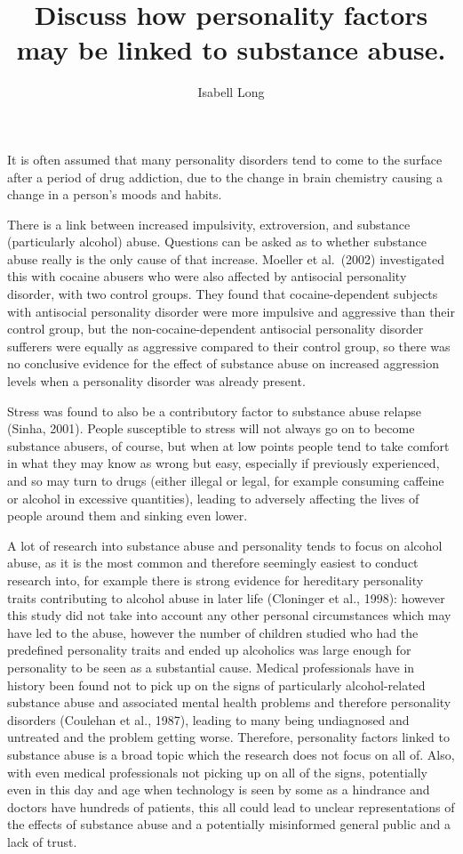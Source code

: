 \documentclass[a4paper]{article}
\begin{document}
\title{Discuss how personality factors may be linked to substance abuse.}	
\author{Isabell Long}
\maketitle

It is often assumed that many personality disorders tend to come to the surface after a period of drug addiction, due to the change in brain chemistry causing a change in a person's moods and habits.

There is a link between increased impulsivity, extroversion, and substance (particularly alcohol) abuse.  Questions can be asked as to whether substance abuse really is the only cause of that increase.  Moeller et al.\ (2002) investigated this with cocaine abusers who were also affected by antisocial personality disorder, with two control groups.  They found that cocaine-dependent subjects with antisocial personality disorder were more impulsive and aggressive than their control group, but the non-cocaine-dependent antisocial personality disorder sufferers were equally as aggressive compared to their control group, so there was no conclusive evidence for the effect of substance abuse on increased aggression levels when a personality disorder was already present.

Stress was found to also be a contributory factor to substance abuse relapse (Sinha, 2001).  People susceptible to stress will not always go on to become substance abusers, of course, but when at low points people tend to take comfort in what they may know as wrong but easy, especially if previously experienced, and so may turn to drugs (either illegal or legal, for example consuming caffeine or alcohol in excessive quantities), leading to adversely affecting the lives of people around them and sinking even lower.

A lot of research into substance abuse and personality tends to focus on alcohol abuse, as it is the most common and therefore seemingly easiest to conduct research into, for example there is strong evidence for hereditary personality traits contributing to alcohol abuse in later life (Cloninger et al., 1998): however this study did not take into account any other personal circumstances which may have led to the abuse, however the number of children studied who had the predefined personality traits and ended up alcoholics was large enough for personality to be seen as a substantial cause.  Medical professionals have in history been found not to pick up on the signs of particularly alcohol-related substance abuse and associated mental health problems and therefore personality disorders (Coulehan et al., 1987), leading to many being undiagnosed and untreated and the problem getting worse.   Therefore, personality factors linked to substance abuse is a broad topic which the research does not focus on all of.  Also, with even medical professionals not picking up on all of the signs, potentially even in this day and age when technology is seen by some as a hindrance and doctors have hundreds of patients, this all could lead to unclear representations of the effects of substance abuse and a potentially misinformed general public and a lack of trust.
\end{document}
